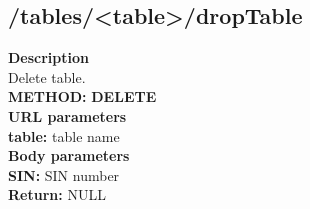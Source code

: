 \documentclass[a4paper, 12pt]{report}
\begin{document}
\subsection{/tables/<table>/dropTable}
\textbf{\color{redText} Description} \\
Delete table. \\
\textbf{\color{redText} METHOD: } \textbf{DELETE} \\
\textbf{\color{redText} URL parameters} \\
\textbf{table: } table name\\
\textbf{\color{redText} Body parameters} \\
\textbf{SIN: } SIN number\\
\textbf{\color{redText} Return: } NULL
\end{document}
